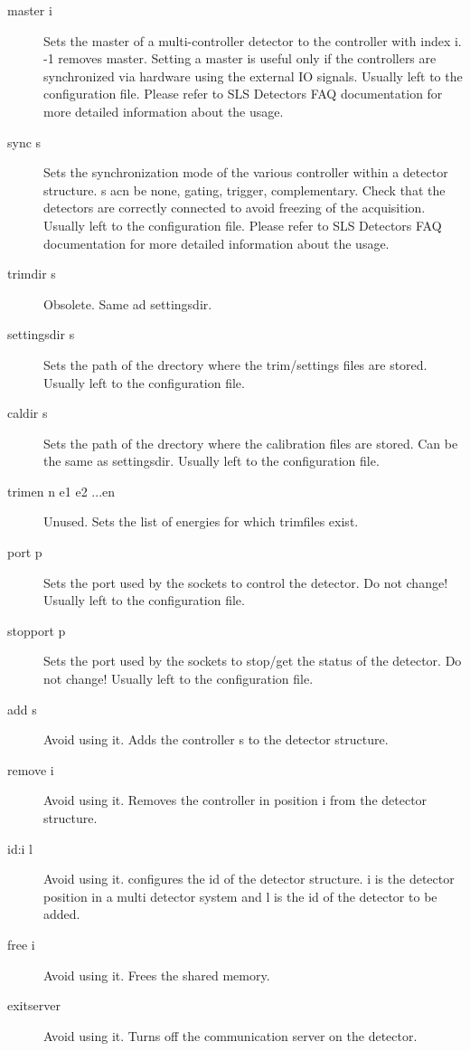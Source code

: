 \documentclass{article}
\begin{document}
\begin{description}
\item[master i] Sets the master of a multi-controller detector to the controller with index i. -1 removes master. Setting a master is useful only if the controllers are synchronized via hardware using the external IO signals. Usually left to the configuration file. Please refer to SLS Detectors FAQ documentation for more detailed information about the usage.  
\item[sync s] Sets the synchronization mode of the various controller within a detector structure. s acn be none, gating, trigger, complementary. Check that the detectors are correctly connected to avoid freezing of the acquisition. Usually left to the configuration file. Please refer to SLS Detectors FAQ documentation for more detailed information about the usage.
\item[trimdir s] Obsolete. Same ad settingsdir.
\item[settingsdir s] Sets the path of the drectory where the trim/settings files are stored. Usually left to the configuration file.
\item[caldir s]    Sets the path of the drectory where the calibration files are stored. Can be the same as settingsdir. Usually left to the configuration file. 
\item[trimen n e1 e2 ...en] Unused. Sets the list of energies for which trimfiles exist.
\item[port p] Sets the port used by the sockets to control the detector. Do not change! Usually left to the configuration file.
\item[stopport p] Sets the port used by the sockets to stop/get the status of the detector. Do not change! Usually left to the configuration file.
\item[add s] Avoid using it. Adds the controller s to the detector structure.  
\item[remove i] Avoid using it. Removes the controller in position i from the detector structure.  
\item[id:i l]  Avoid using it. configures the id of the detector structure. i is the detector position in a multi detector system and l is the id of the detector to be added. 
\item[free i]  Avoid using it. Frees the shared memory. 
\item[exitserver]   Avoid using it. Turns off the communication server on the detector.
\end{description}
\end{document}
